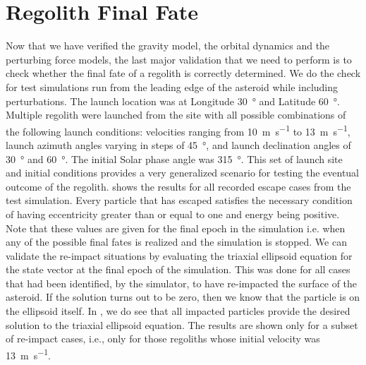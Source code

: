 \FloatBarrier

\section{Regolith Final Fate}
\label{sec:final_fate_vv}
Now that we have verified the gravity model, the orbital dynamics and the perturbing force models, the last major validation that we need to perform is to check whether the final fate of a regolith is correctly determined. We do the check for test simulations run from the leading edge of the asteroid while including perturbations. The launch location was at Longitude \SI{30}{\degree} and Latitude \SI{60}{\degree}. Multiple regolith were launched from the site with all possible combinations of the following launch conditions: velocities ranging from \SI{10}{\metre \per \second} to \SI{13}{\metre \per \second}, launch azimuth angles varying in steps of \SI{45}{\degree}, and launch declination angles of \SI{30}{\degree} and \SI{60}{\degree}. The initial Solar phase angle was \SI{315}{\degree}.
%
\newline\newline
%
This set of launch site and initial conditions provides a very generalized scenario for testing the eventual outcome of the regolith.  shows the results for all recorded escape cases from the test simulation. Every particle that has escaped satisfies the necessary condition of having eccentricity greater than or equal to one and energy being positive. Note that these values are given for the final epoch in the simulation i.e. when any of the possible final fates is realized and the simulation is stopped.
%
\newline\newline
%
We can validate the re-impact situations by evaluating the triaxial ellipsoid equation for the state vector at the final epoch of the simulation. This was done for all cases that had been identified, by the simulator, to have re-impacted the surface of the asteroid. If the solution turns out to be zero, then we know that the particle is on the ellipsoid itself. In , we do see that all impacted particles provide the desired solution to the triaxial ellipsoid equation. The results are shown only for a subset of re-impact cases, i.e., only for those regoliths whose initial velocity was \SI{13}{\metre \per \second}.
